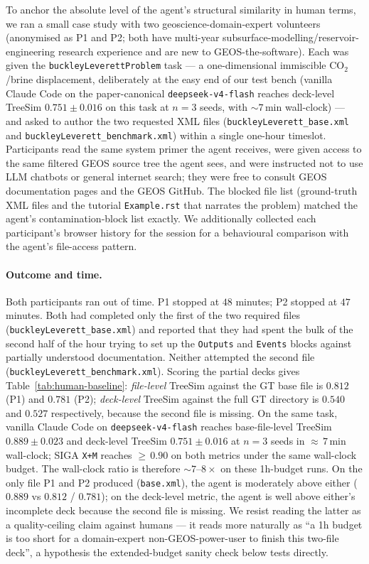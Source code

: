 \documentclass{article}
\begin{document}
To anchor the absolute level of the agent's structural similarity in human terms, we ran a small case study with two geoscience-domain-expert volunteers (anonymised as P1 and P2; both have multi-year subsurface-modelling/reservoir-engineering research experience and are new to GEOS-the-software). Each was given the \texttt{buckleyLeverettProblem} task --- a one-dimensional immiscible CO$_2$/brine displacement, deliberately at the easy end of our test bench (vanilla Claude Code on the paper-canonical \texttt{deepseek-v4-flash} reaches deck-level TreeSim $0.751 \pm 0.016$ on this task at $n=3$ seeds, with $\sim\!7\,$min wall-clock) --- and asked to author the two requested XML files (\texttt{buckleyLeverett\_base.xml} and \texttt{buckleyLeverett\_benchmark.xml}) within a single one-hour timeslot. Participants read the same system primer the agent receives, were given access to the same filtered GEOS source tree the agent sees, and were instructed not to use LLM chatbots or general internet search; they were free to consult GEOS documentation pages and the GEOS GitHub. The blocked file list (ground-truth XML files and the tutorial \texttt{Example.rst} that narrates the problem) matched the agent's contamination-block list exactly. We additionally collected each participant's browser history for the session for a behavioural comparison with the agent's file-access pattern.

\paragraph{Outcome and time.} Both participants ran out of time. P1 stopped at $48$ minutes; P2 stopped at $47$ minutes. Both had completed only the first of the two required files (\texttt{buckleyLeverett\_base.xml}) and reported that they had spent the bulk of the second half of the hour trying to set up the \texttt{Outputs} and \texttt{Events} blocks against partially understood documentation. Neither attempted the second file (\texttt{buckleyLeverett\_benchmark.xml}). Scoring the partial decks gives Table~\ref{tab:human-baseline}: \emph{file-level} TreeSim against the GT base file is $0.812$ (P1) and $0.781$ (P2); \emph{deck-level} TreeSim against the full GT directory is $0.540$ and $0.527$ respectively, because the second file is missing. On the same task, vanilla Claude Code on \texttt{deepseek-v4-flash} reaches base-file-level TreeSim $0.889 \pm 0.023$ and deck-level TreeSim $0.751 \pm 0.016$ at $n=3$ seeds in ${\approx}\,7\,$min wall-clock; SIGA \texttt{X+M} reaches ${\geq}\,0.90$ on both metrics under the same wall-clock budget. The wall-clock ratio is therefore ${\sim}7$--$8\times$ on these 1h-budget runs. On the only file P1 and P2 produced (\texttt{base.xml}), the agent is moderately above either ($0.889$ vs $0.812$ / $0.781$); on the deck-level metric, the agent is well above either's incomplete deck because the second file is missing. We resist reading the latter as a quality-ceiling claim against humans --- it reads more naturally as ``a 1h budget is too short for a domain-expert non-GEOS-power-user to finish this two-file deck'', a hypothesis the extended-budget sanity check below tests directly.
\end{document}
